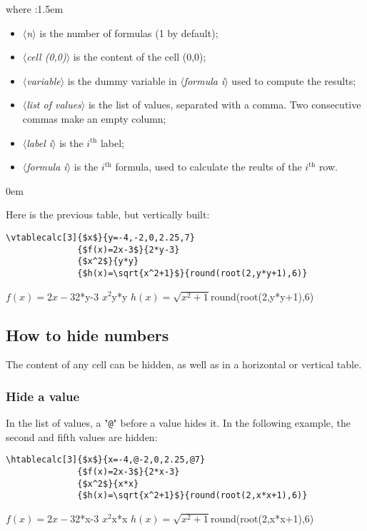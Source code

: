\documentclass[a4paper,10pt]{article}
\newcommand\argu[1]{$\langle$\textit{#1}$\rangle$}
\newcommand\mywidth{0.85\linewidth}
\begin{document}
where :\parindent1.5em
\begin{itemize}
	\item \argu{n} is the number of formulas (1 by default);
	\item \argu{cell (0,0)} is the content of the cell (0,0);
	\item \argu{variable} is the dummy variable in \argu{formula i} used to compute the results;
	\item \argu{list of values} is the list of values, separated with a comma. Two consecutive commas make an empty column;
	\item \argu{label i} is the $i{}^\text{th}$ label;
	\item \argu{formula i} is the $i^\text{th}$ formula, used to calculate the reults of the $i^\text{th}$ row.
\end{itemize}\parindent0em
\medskip

Here is the previous table, but vertically built:\par\nobreak
\begin{center}
\begin{minipage}{\mywidth}
\begin{lstlisting}
\vtablecalc[3]{$x$}{y=-4,-2,0,2.25,7}
              {$f(x)=2x-3$}{2*y-3}
              {$x^2$}{y*y}
              {$h(x)=\sqrt{x^2+1}$}{round(root(2,y*y+1),6)}
\end{lstlisting}
\end{minipage}

              {$f(x)=2x-3$}{2*y-3}
              {$x^2$}{y*y}
              {$h(x)=\sqrt{x^2+1}$}{round(root(2,y*y+1),6)}
\end{center}

\subsection{How to hide numbers}\label{masquercellules}
The content of any cell can be hidden, as well as in a horizontal or vertical table.

\subsubsection{Hide a value}
In the list of values, a "\verb|@|" before a value hides it. In the following example, the second and fifth values are hidden:\smallskip
\begin{center}
\begin{minipage}{\mywidth}
\begin{lstlisting}
\htablecalc[3]{$x$}{x=-4,@-2,0,2.25,@7}
              {$f(x)=2x-3$}{2*x-3}
              {$x^2$}{x*x}
              {$h(x)=\sqrt{x^2+1}$}{round(root(2,x*x+1),6)}
\end{lstlisting}
\end{minipage}

              {$f(x)=2x-3$}{2*x-3}
              {$x^2$}{x*x}
              {$h(x)=\sqrt{x^2+1}$}{round(root(2,x*x+1),6)}
\end{center}
\medskip
\end{document}
